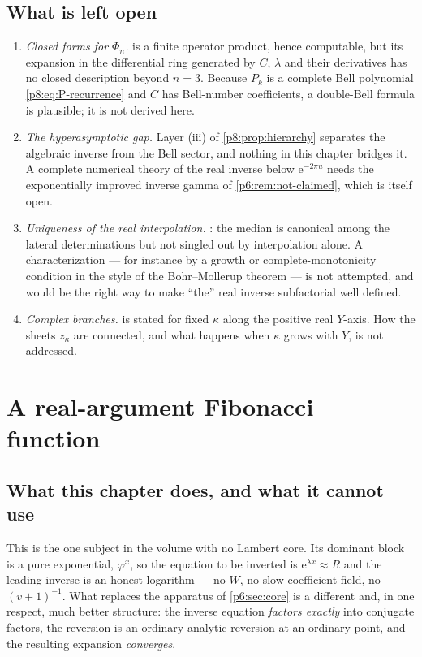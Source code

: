 \documentclass[11pt,a4paper,oneside]{book}
\theoremstyle{plain}
\theoremstyle{definition}
\theoremstyle{remark}
\newcommand{\e}{\mathrm{e}}
\newcommand{\Wlam}{W}
\begin{document}
\section{What is left open}
\label{p8:sec:open}

\begin{enumerate}
\item \emph{Closed forms for $\Phi_n$.}   is a finite
operator product, hence computable, but its expansion in the differential ring
generated by $C$, $\lambda$ and their derivatives has no closed description
beyond $n=3$.  Because $P_k$ is a complete Bell polynomial
\eqref{p8:eq:P-recurrence} and $C$ has Bell-number coefficients, a
double-Bell formula is plausible; it is not derived here.
\item \emph{The hyperasymptotic gap.}  Layer (iii) of
\cref{p8:prop:hierarchy} separates the algebraic inverse from the Bell sector,
and nothing in this chapter bridges it.  A complete numerical theory of the
real inverse below $\e^{-2\pi u}$ needs the exponentially improved inverse
gamma of \cref{p6:rem:not-claimed}, which is itself open.
\item \emph{Uniqueness of the real interpolation.}  :
the median is canonical among the lateral determinations but not singled out
by interpolation alone.  A characterization --- for instance by a growth or
complete-monotonicity condition in the style of the Bohr--Mollerup theorem ---
is not attempted, and would be the right way to make ``the'' real inverse
subfactorial well defined.
\item \emph{Complex branches.}   is stated for
fixed $\kappa$ along the positive real $Y$-axis.  How the sheets $z_\kappa$
are connected, and what happens when $\kappa$ grows with $Y$, is not
addressed.
\end{enumerate}

\chapter{A real-argument Fibonacci function}
\label{p9:sec:top}

\section{What this chapter does, and what it cannot use}
\label{p9:sec:intro}

This is the one subject in the volume with no Lambert core.  Its dominant
block is a pure exponential, $\varphi^{x}$, so the equation to be inverted is
$\e^{\lambda x}\approx R$ and the leading inverse is an honest logarithm ---
no $\Wlam$, no slow coefficient field, no $(v+1)^{-1}$.  What replaces the
apparatus of \cref{p6:sec:core} is a different and, in one respect, much
better structure: the inverse equation \emph{factors exactly} into conjugate
factors, the reversion is an ordinary analytic reversion at an ordinary
point, and the resulting expansion \emph{converges}.
\end{document}
